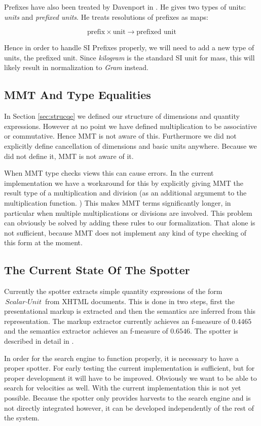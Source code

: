 Prefixes have also been treated by Davenport in \cite{SD:UnitKnowledgeMgmt08}. He gives two types of units: \textit{units} and \textit{prefixed units}. He treats resolutions of prefixes as maps:

\[\text{prefix} \times \text{unit} \rightarrow \text{prefixed unit}\]

Hence in order to handle SI Prefixes properly, we will need to add a new type of units, the prefixed unit. Since \textit{kilogram} is the standard SI unit for mass, this will likely result in normalization to \textit{Gram} instead.
\subsection{MMT And Type Equalities}

In Section \ref{sec:strucqe} we defined our structure of dimensions and quantity expressions. However at no point we have defined multiplication to be associative or commutative. Hence MMT is not aware of this. Furthermore we did not explicitly define cancellation of dimensions and basic units anywhere. Because we did not define it, MMT is not aware of it.

When MMT type checks views this can cause errors. In the current implementation we have a workaround for this by explicitly giving MMT the result type of a multiplication and division (as an additional argumemt to the multiplication function. ) This makes MMT terms significantly longer, in particular when multiple multiplications or divisions are involved.  This problem can obviously be solved by adding these rules to our formalization. That alone is not sufficient, because MMT does not implement any kind of type checking of this form at the moment.

\subsection{The Current State Of The Spotter}

Currently the spotter extracts simple quantity expressions of the form $\textit{Scalar} \cdot{} \textit{Unit}$ from XHTML documents. This is done in two steps, first the presentational markup is extracted and then the semantics are inferred from this representation. The markup extractor currently achieves an f-measure of $0.4465$ and the semantics extractor achieves an f-measure of $0.6546$. The spotter is described in detail in \cite{thesis:sharko}.

In order for the search engine to function properly, it is necessary to have a proper spotter. For early testing the current implementation is sufficient, but for proper development it will have to be improved. Obviously we want to be able to search for velocities as well. With the current implementation this is not yet possible. Because the spotter only provides harvests to the search engine and is not directly integrated however, it can be developed independently of the rest of the system.

